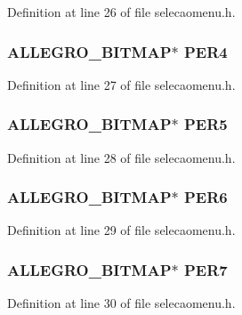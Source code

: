 Definition at line 26 of file selecaomenu.\-h.

\hypertarget{structlg_images_ac7ed3922422519caecb1441e0e47f9f5}{
\subsubsection[{P\-E\-R4}]{\setlength{\rightskip}{0pt plus 5cm}A\-L\-L\-E\-G\-R\-O\-\_\-\-B\-I\-T\-M\-A\-P$\ast$ P\-E\-R4}}\label{structlg_images_ac7ed3922422519caecb1441e0e47f9f5}


Definition at line 27 of file selecaomenu.\-h.

\hypertarget{structlg_images_a128effb8f487de492fe834f0dc787bbc}{
\subsubsection[{P\-E\-R5}]{\setlength{\rightskip}{0pt plus 5cm}A\-L\-L\-E\-G\-R\-O\-\_\-\-B\-I\-T\-M\-A\-P$\ast$ P\-E\-R5}}\label{structlg_images_a128effb8f487de492fe834f0dc787bbc}


Definition at line 28 of file selecaomenu.\-h.

\hypertarget{structlg_images_ac887b2602b833b8b666118bd6d567072}{
\subsubsection[{P\-E\-R6}]{\setlength{\rightskip}{0pt plus 5cm}A\-L\-L\-E\-G\-R\-O\-\_\-\-B\-I\-T\-M\-A\-P$\ast$ P\-E\-R6}}\label{structlg_images_ac887b2602b833b8b666118bd6d567072}


Definition at line 29 of file selecaomenu.\-h.

\hypertarget{structlg_images_a1c853dd3f6fd593433dfa8fc05e169db}{
\subsubsection[{P\-E\-R7}]{\setlength{\rightskip}{0pt plus 5cm}A\-L\-L\-E\-G\-R\-O\-\_\-\-B\-I\-T\-M\-A\-P$\ast$ P\-E\-R7}}\label{structlg_images_a1c853dd3f6fd593433dfa8fc05e169db}


Definition at line 30 of file selecaomenu.\-h.

